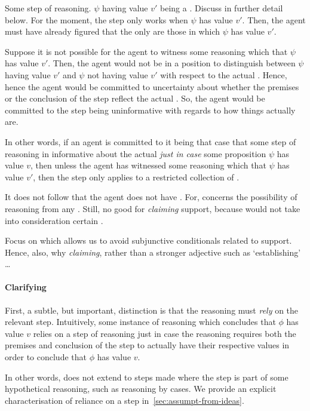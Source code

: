 \begin{note}
  Some step of reasoning.
  \(\psi\) having value \(v'\) being a \requ{}.
  Discuss in further detail below.
  For the moment, the step only works when \(\psi\) has value \(v'\).
  Then, the agent must have already figured that the only  are those in which \(\psi\) has value \(v'\).

  Suppose it is not possible for the agent to witness some reasoning which  that \(\psi\) has value \(v'\).
  Then, the agent would not be in a position to distinguish between \(\psi\) having value \(v'\) and \(\psi\) not having value \(v'\) with respect to the actual \world{}.
  Hence, hence the agent would be committed to uncertainty about whether the premises or the conclusion of the step reflect the actual \world{}.
  So, the agent would be committed to the step being uninformative with regards to how things actually are.

  In other words, if an agent is committed to it being that case that some step of reasoning in informative about the actual \world{} \emph{just in case} some proposition \(\psi\) has value \(v\), then unless the agent has witnessed some reasoning which  that \(\psi\) has value \(v'\), then the step only applies to a restricted collection of .

  It does not follow that the agent does not have \support{}.
  For, \support{} concerns the possibility of reasoning from any \epPW{}.
  Still, no good for \emph{claiming} support, because would not take into consideration certain .
\end{note}

\begin{note}
  Focus on  which allows us to avoid subjunctive conditionals related to support.
  Hence, also, why \emph{claiming}, rather than a stronger adjective such as `establishing' \dots
\end{note}

\paragraph{Clarifying \ideaCS{}}

\begin{note}
  First, a subtle, but important, distinction is that the reasoning must \emph{rely} on the relevant step.
  Intuitively, some instance of reasoning which concludes that \(\phi\) has value \(v\) relies on a step of reasoning just in case the reasoning requires both the premises and conclusion of the step to actually have their respective values in order to conclude that \(\phi\) has value \(v\).

  In other words, \ideaCS{} does not extend to steps made where the step is part of some hypothetical reasoning, such as reasoning by cases.
  We provide an explicit characterisation of reliance on a step in~\autoref{sec:assumpt-from-ideas}.
\end{note}

